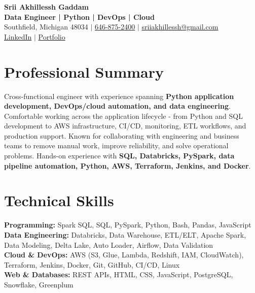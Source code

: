 \documentclass[letterpaper,10pt]{article}
\begin{document}
\fontsize{9.35pt}{10.45pt}\selectfont

\begin{center}
    {\LARGE \textbf{Srii Akhillessh Gaddam}} \\[-1pt]
    \textbf{Data Engineer | Python | DevOps | Cloud} \\[2pt]
    Southfield, Michigan 48034 $|$
    \href{tel:6468752400}{646-875-2400} $|$
    \href{mailto:sriiakhillessh@gmail.com}{sriiakhillessh@gmail.com} \\[1pt]
    \href{https://www.linkedin.com/in/srii-akhiilessh-gaddam-b48668191/}{LinkedIn} $|$
    \href{https://sriiakhillesshg.github.io/portfolio/}{Portfolio}
\end{center}
\vspace{-8pt}

\section{Professional Summary}
\small{Cross-functional engineer with experience spanning \textbf{Python application development, DevOps/cloud automation, and data engineering}. Comfortable working across the application lifecycle - from Python and SQL development to AWS infrastructure, CI/CD, monitoring, ETL workflows, and production support. Known for collaborating with engineering and business teams to remove manual work, improve reliability, and solve operational problems. Hands-on experience with \textbf{SQL, Databricks, PySpark, data pipeline automation, Python, AWS, Terraform, Jenkins, and Docker}.}

\section{Technical Skills}
\small{
\textbf{Programming:} Spark SQL, SQL, PySpark, Python, Bash, Pandas, JavaScript \\
\textbf{Data Engineering:} Databricks, Data Warehouse, ETL/ELT, Apache Spark, Data Modeling, Delta Lake, Auto Loader, Airflow, Data Validation \\
\textbf{Cloud \& DevOps:} AWS (S3, Glue, Lambda, Redshift, IAM, CloudWatch), Terraform, Jenkins, Docker, Git, GitHub, CI/CD, Linux \\
\textbf{Web \& Databases:} REST APIs, HTML, CSS, JavaScript, PostgreSQL, Snowflake, Greenplum
}
\end{document}
